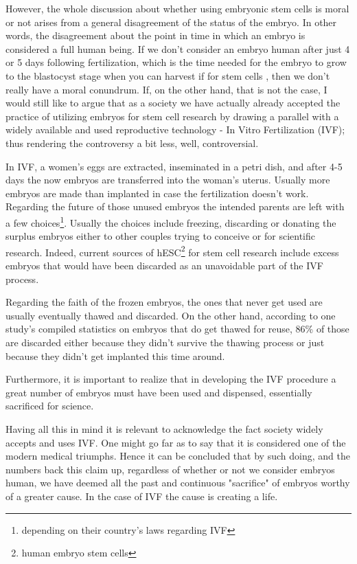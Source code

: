 \documentclass[12pt]{article} %
\begin{document}
However, the whole discussion about whether using embryonic stem cells is moral or not arises from a general disagreement of the status of the embryo. In other words, the disagreement about the point in time in which an embryo is considered a full human being. If we don't consider an embryo human after just 4 or 5 days following fertilization, which is the time needed for the embryo to grow to the blastocyst stage when you can harvest if for stem cells \cite{Landry:2016}, then we don't really have a moral conundrum. If, on the other hand, that is not the case, I would still like to argue that as a society we have actually already accepted the practice of utilizing embryos for stem cell research by drawing a parallel with a widely available and used reproductive technology - In Vitro Fertilization (IVF); thus rendering the controversy a bit less, well, controversial. 

In IVF, a women's eggs are extracted, inseminated in a petri dish, and after 4-5 days the now embryos are transferred into the woman's uterus. Usually more embryos are made than implanted in case the fertilization doesn't work. 
Regarding the future of those unused embryos the intended parents are left with a few choices\footnote{depending on their country's laws regarding IVF}. Usually the choices include freezing, discarding or donating the surplus embryos either to other couples trying to conceive or for scientific research. 
Indeed, current sources of hESC\footnote{human embryo stem cells} for stem cell research include excess embryos that would have been discarded as an unavoidable part of the IVF process\cite{Pediatrics:2012}.

Regarding the faith of the frozen embryos, the ones that never get used are usually eventually thawed and discarded. On the other hand, according to one study's \cite{Pavone:2011} compiled statistics on embryos that do get thawed for reuse, 86\% of those are discarded either because they didn't survive the thawing process or just because they didn't get implanted this time around. 

Furthermore, it is important to realize that in developing the IVF procedure a great number of embryos must have been used and dispensed, essentially sacrificed for science. 

Having all this in mind it is relevant to acknowledge the fact society widely accepts and uses IVF. One might go far as to say that it is considered one of the modern medical triumphs. Hence it can be concluded that by such doing, and the numbers back this claim up, regardless of whether or not we consider embryos human, we have deemed all the past and continuous "sacrifice" of embryos worthy of a greater cause. In the case of IVF the cause is creating a life.
\end{document}
